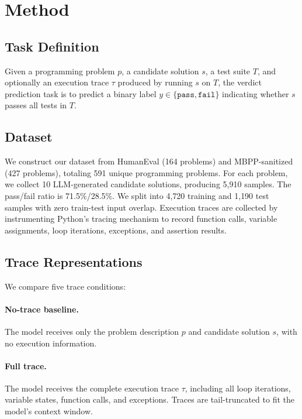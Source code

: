 \documentclass[11pt]{article}
\begin{document}
\section{Method}
\label{sec:method}

\subsection{Task Definition}

Given a programming problem $p$, a candidate solution $s$, a test suite $T$, and optionally an execution trace $\tau$ produced by running $s$ on $T$, the verdict prediction task is to predict a binary label $y \in \{\texttt{pass}, \texttt{fail}\}$ indicating whether $s$ passes all tests in $T$.

\subsection{Dataset}

We construct our dataset from HumanEval (164 problems) and MBPP-sanitized (427 problems), totaling 591 unique programming problems. For each problem, we collect 10 LLM-generated candidate solutions, producing 5{,}910 samples. The pass/fail ratio is 71.5\%/28.5\%. We split into 4{,}720 training and 1{,}190 test samples with zero train-test input overlap. Execution traces are collected by instrumenting Python's tracing mechanism to record function calls, variable assignments, loop iterations, exceptions, and assertion results.

\subsection{Trace Representations}

We compare five trace conditions:

\paragraph{No-trace baseline.} The model receives only the problem description $p$ and candidate solution $s$, with no execution information.

\paragraph{Full trace.} The model receives the complete execution trace $\tau$, including all loop iterations, variable states, function calls, and exceptions. Traces are tail-truncated to fit the model's context window.
\end{document}
